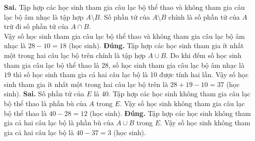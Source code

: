 \begin{ex}
{\begin{center}
	\end{center}
		\begin{itemchoice}
			\itemch \textbf{Sai.} Tập hợp các học sinh tham gia câu lạc bộ thể thao và không tham gia câu lạc bộ âm nhạc là tập hợp $A \setminus B$. Số phần tử của $A \setminus B$ chính là số phần tử của $A$ trừ đi số phần tử của $A \cap B$.\\
			Vậy số học sinh tham gia câu lạc bộ thể thao và không tham gia câu lạc bộ âm nhạc là $28-10=18$ (học sinh).
			\itemch \textbf{Đúng.} Tập hợp các học sinh tham gia ít nhất một trong hai câu lạc bộ trên chính là tập hợp $A \cup B$. Do khi đếm số học sinh tham gia câu lạc bộ thể thao là $28$, số học sinh tham gia câu lạc bộ âm nhạc là $19$ thì số học sinh tham gia cả hai câu lạc bộ là 10 được tính hai lần. Vậy số học sinh tham gia ít nhất một trong hai câu lạc bộ trên là
			    $28+19-10=37$ (học sinh).
			\itemch \textbf{Sai.} Số phần tử của $E$ là 40. Tập hợp các học sinh không tham gia câu lạc bộ thể thao là phần bù của $A$ trong $E$. Vậy số học sinh không tham gia câu lạc bộ thể thao là $40-28=12$ (học sinh).
			\itemch \textbf{Đúng.} Tập hợp các học sinh không tham gia cả hai câu lạc bộ là phần bù của $A \cup B$ trong $E$. Vậy số học sinh không tham gia cả hai câu lạc bộ là $40-37=3$ (học sinh).
		\end{itemchoice}
}
\end{ex}

